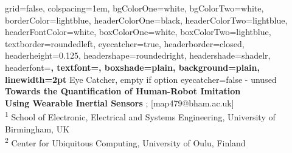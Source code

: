 \documentclass[a0paper,portrait]{baposter}
\begin{document}







\begin{poster}%
  {
  grid=false,
  colspacing=1em,
  bgColorOne=white,
  bgColorTwo=white,
  borderColor=lightblue,
  headerColorOne=black,
  headerColorTwo=lightblue,
  headerFontColor=white,
  boxColorOne=white,
  boxColorTwo=lightblue,
  textborder=roundedleft,
  eyecatcher=true,
  headerborder=closed,
  headerheight=0.125\textheight,
  headershape=roundedright,
  headershade=shadelr,
  headerfont=\Large\bf\textsc, %
  textfont={\setlength{\parindent}{1.5em}},
  boxshade=plain,
  background=plain,
  linewidth=2pt
  }
{
	Eye Catcher, empty if option eyecatcher=false - unused
}
{\bf
  {Towards the Quantification of Human-Robot Imitation \\ Using Wearable Inertial Sensors}
}
{
	{; [map479@bham.ac.uk]  } \\ 
	{\smaller
	\textsuperscript{1} School of Electronic, Electrical and Systems Engineering, University of Birmingham, UK \\
	\textsuperscript{2} Center for Ubiquitous Computing, University of Oulu, Finland }
}
%     
%       



\end{poster}
\end{document}
